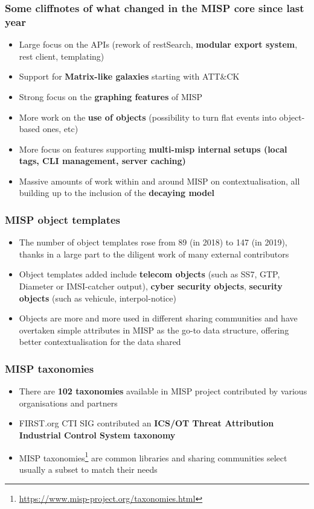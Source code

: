 \begin{frame}
        \frametitle{Some cliffnotes of what changed in the MISP core since last year}
        \begin{itemize}
                \item Large focus on the APIs (rework of restSearch, {\bf modular export system}, rest client, templating)
                \item Support for {\bf Matrix-like galaxies} starting with ATT\&CK
                \item Strong focus on the {\bf graphing features} of MISP
                \item More work on the {\bf use of objects} (possibility to turn flat events into object-based ones, etc)
                \item More focus on features supporting {\bf multi-misp internal setups (local tags, CLI management, server caching)}
                \item Massive amounts of work within and around MISP on contextualisation, all building up to the inclusion of the {\bf decaying model}
        \end{itemize}
\end{frame}

\begin{frame}
        \frametitle{MISP object templates}
        \begin{itemize}
                \item The number of object templates rose from 89 (in 2018) to 147 (in 2019), thanks in a large part to the diligent work of many external contributors
                \item Object templates added include {\bf telecom objects} (such as SS7, GTP, Diameter or IMSI-catcher output), {\bf cyber security objects}, {\bf security objects} (such as vehicule, interpol-notice)
                \item Objects are more and more used in different sharing communities and have overtaken simple attributes in MISP as the go-to data structure, offering better contextualisation for the data shared
        \end{itemize}
\end{frame}

\begin{frame}
        \frametitle{MISP taxonomies}
        \begin{itemize}
                \item There are {\bf 102 taxonomies} available in MISP project contributed by various organisations and partners
                \item FIRST.org CTI SIG contributed an {\bf ICS/OT Threat Attribution Industrial Control System taxonomy}
                \item MISP taxonomies\footnote{\url{https://www.misp-project.org/taxonomies.html}} are common libraries and sharing communities select usually a subset to match their needs
        \end{itemize}
\end{frame}


